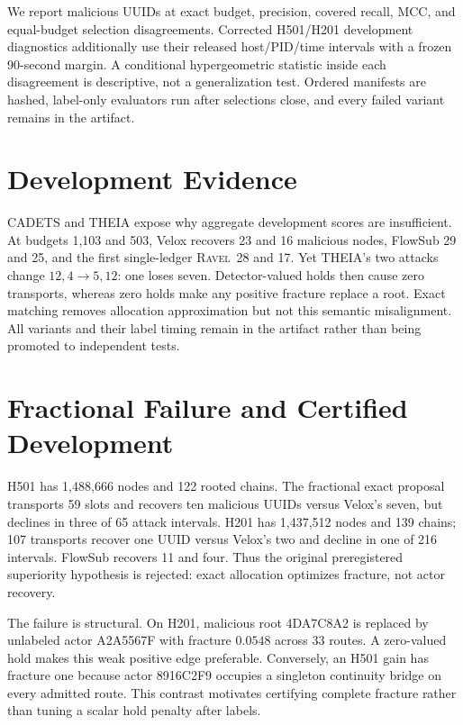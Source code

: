 \documentclass[runningheads]{llncs}
\newcommand{\ravel}{\textsc{Ravel}}
\begin{document}
We report malicious UUIDs at exact budget, precision, covered recall, MCC, and equal-budget selection disagreements. Corrected H501/H201 development diagnostics additionally use their released host/PID/time intervals with a frozen 90-second margin. A conditional hypergeometric statistic inside each disagreement is descriptive, not a generalization test. Ordered manifests are hashed, label-only evaluators run after selections close, and every failed variant remains in the artifact.

\section{Development Evidence}

CADETS and THEIA expose why aggregate development scores are insufficient. At budgets 1,103 and 503, Velox recovers 23 and 16 malicious nodes, FlowSub 29 and 25, and the first single-ledger \ravel\ 28 and 17. Yet THEIA's two attacks change \(12,4\!\rightarrow\!5,12\): one loses seven. Detector-valued holds then cause zero transports, whereas zero holds make any positive fracture replace a root. Exact matching removes allocation approximation but not this semantic misalignment. All variants and their label timing remain in the artifact rather than being promoted to independent tests.

\section{Fractional Failure and Certified Development}

H501 has 1,488,666 nodes and 122 rooted chains. The fractional exact proposal transports 59 slots and recovers ten malicious UUIDs versus Velox's seven, but declines in three of 65 attack intervals. H201 has 1,437,512 nodes and 139 chains; 107 transports recover one UUID versus Velox's two and decline in one of 216 intervals. FlowSub recovers 11 and four. Thus the original preregistered superiority hypothesis is rejected: exact allocation optimizes fracture, not actor recovery.

The failure is structural. On H201, malicious root 4DA7C8A2 is replaced by unlabeled actor A2A5567F with fracture \(0.0548\) across 33 routes. A zero-valued hold makes this weak positive edge preferable. Conversely, an H501 gain has fracture one because actor 8916C2F9 occupies a singleton continuity bridge on every admitted route. This contrast motivates certifying complete fracture rather than tuning a scalar hold penalty after labels.
\end{document}
